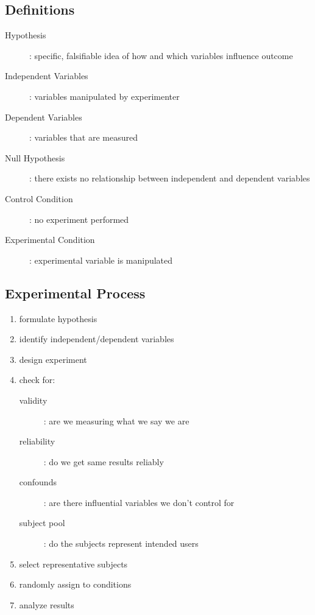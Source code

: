 \documentclass[]{article}
\theoremstyle{definition}
\begin{document}
	\subsection{Definitions}
	\begin{description}
		\item[Hypothesis]: specific, falsifiable idea of how and which variables influence outcome
		\item[Independent Variables]: variables manipulated by experimenter
		\item[Dependent Variables]: variables that are measured
		\item[Null Hypothesis]: there exists no relationship between independent and dependent variables
		\item[Control Condition]: no experiment performed
		\item[Experimental Condition]: experimental variable is manipulated
	\end{description}

	\subsection{Experimental Process}
	\begin{enumerate}
		\item formulate hypothesis
		\item identify independent/dependent variables
		\item design experiment
		\item check for:
			\begin{description}
				\item[validity]: are we measuring what we say we are
				\item[reliability]: do we get same results reliably
				\item[confounds]: are there influential variables we don't control for
				\item[subject pool]: do the subjects represent intended users
			\end{description}
		\item select representative subjects
		\item randomly assign to conditions
		\item analyze results
	\end{enumerate}
\end{document}
